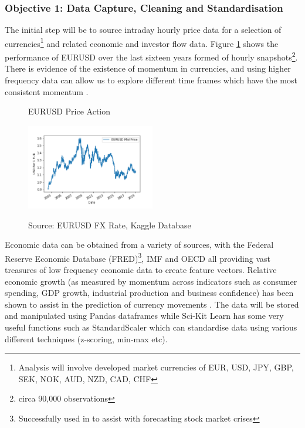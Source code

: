 \documentclass[11pt]{article}
\begin{document}
\subsubsection{Objective 1: Data Capture, Cleaning and Standardisation}

The initial step will be to source intraday hourly price data for a selection of currencies\footnote{Analysis will involve developed market currencies of EUR, USD, JPY, GBP, SEK, NOK, AUD, NZD, CAD, CHF} and related economic and investor flow data. Figure \ref{fig:EURUSDPrice} shows the performance of EURUSD over the last sixteen years formed of hourly snapshots\footnote{circa 90,000 observations}.
\newline There is evidence of the existence of momentum in currencies, and using higher frequency data can allow us to explore different time frames which have the most consistent momentum \cite{Filippou2017}. 
\begin{figure}[h]
    \centering
	\caption{EURUSD Price Action}
    \includegraphics[width=0.5\textwidth]{EURUSDPrice}   
    \label{fig:EURUSDPrice}
\caption*{\small Source: EURUSD FX Rate, Kaggle Database}
\end{figure}
Economic data can be obtained from a variety of sources, with the Federal Reserve Economic Database (FRED)\footnote{Successfully used in \cite{Chatzis2018} to assist with forecasting stock market crises}, IMF and OECD all providing vast treasures of low frequency economic data to create feature vectors. Relative economic growth (as measured by momentum across indicators such as consumer spending, GDP growth, industrial production and business confidence) has been shown to assist in the prediction of currency movements \cite{Dahlquist2015}.  
\newline The data will be stored and manipulated using Pandas dataframes while Sci-Kit Learn has some very useful functions such as StandardScaler which can standardise data using various different techniques (z-scoring, min-max etc).
\end{document}

